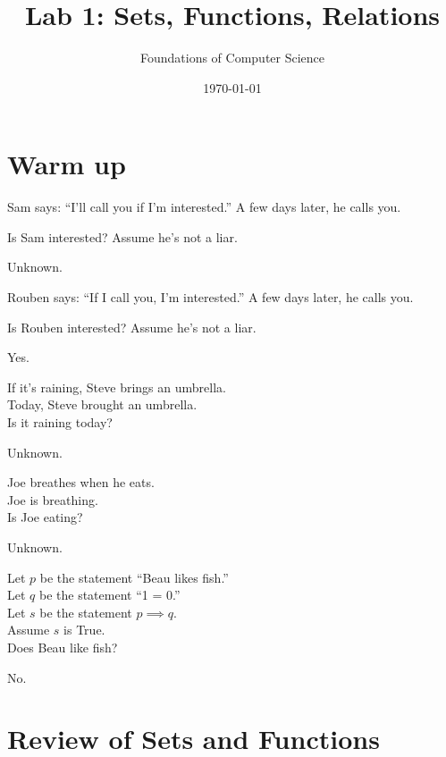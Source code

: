 \documentclass[]{exam}
\title{Lab 1: Sets, Functions, Relations}
\author{Foundations of Computer Science}
\date{\today}
\begin{document}
\maketitle

\begin{questions}

\section*{Warm up}
\question
Sam says: ``I'll call you if I'm interested.'' A few days later, he calls you.

Is Sam interested? Assume he's not a liar.

\begin{solution}
Unknown.
\end{solution}

\question
Rouben says: ``If I call you, I'm interested.'' A few days later, he calls you.

Is Rouben interested? Assume he's not a liar.

\begin{solution}
Yes.
\end{solution}


\question If it's raining, Steve brings an umbrella.\\
    Today, Steve brought an umbrella.\\
    Is it raining today?

\begin{solution}
Unknown.
\end{solution}


\question Joe breathes when he eats.\\
    Joe is breathing.\\
    Is Joe eating?
\begin{solution}
Unknown.
\end{solution}


\question Let $p$ be the statement ``Beau likes fish.''\\
    Let $q$ be the statement ``1 = 0.''\\
    Let $s$ be the statement $p \implies q$.\\
    Assume $s$ is True.\\
    Does Beau like fish?
\begin{solution}
No.
\end{solution}


\section*{Review of Sets and Functions}

\end{questions}
\end{document}
